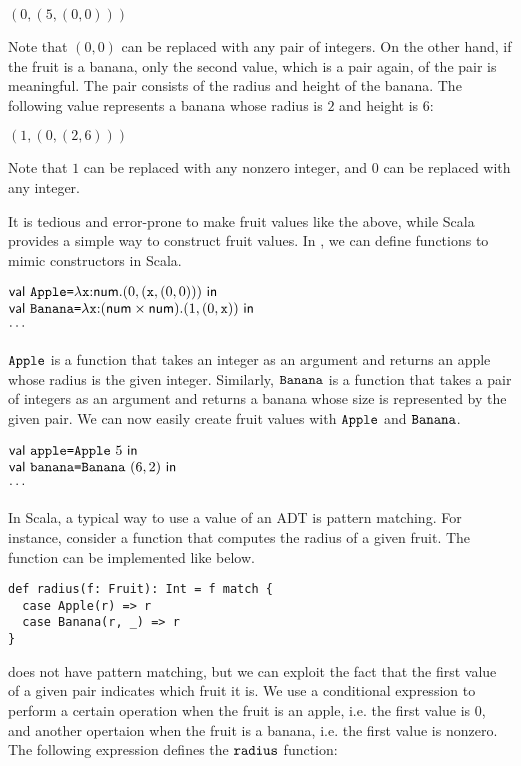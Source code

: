 $(0,(5,(0,0)))$

Note that $(0,0)$ can be replaced with any pair of integers. On the other hand,
if the fruit is a banana, only the second value, which is a pair again, of the
pair is meaningful. The pair consists of the radius and height of the banana.
The following value represents a banana whose radius is $2$ and height is $6$:

$(1,(0,(2,6)))$

Note that $1$ can be replaced with any nonzero integer, and $0$ can be replaced
with any integer.

It is tedious and error-prone to make fruit values like the above, while Scala
provides a simple way to construct fruit values. In \plang, we can define
functions to mimic constructors in Scala.

$
\begin{array}{@{}l}
  \ebind{\code{Apple}}{\efunt{\cx}{\tnum}{(0,(\cx,(0,0)))}}{\\
  \ebind{\code{Banana}}{\efunt{\cx}{(\tnum\times\tnum)}{(1,(0,\cx))}}{\\
  \cdots}}
\end{array}
$

$\texttt{Apple}$ is a function that takes an integer as an argument and returns an
apple whose radius is the given integer. Similarly, $\texttt{Banana}$ is a
function that takes a pair of integers as an argument and returns a banana whose
size is represented by the given pair. We can now easily create fruit values
with $\texttt{Apple}$ and $\texttt{Banana}$.

$
\begin{array}{@{}l}
  \ebind{\code{apple}}{\code{Apple}\ 5}{\\
  \ebind{\code{banana}}{\code{Banana}\ (6,2)}{\\
  \cdots}}
\end{array}
$

In Scala, a typical way to use a value of an ADT is pattern matching. For
instance, consider a function that computes the radius of a given fruit.
The function can be implemented like below.

\begin{verbatim}
def radius(f: Fruit): Int = f match {
  case Apple(r) => r
  case Banana(r, _) => r
}
\end{verbatim}

\plang does not have pattern matching, but we can exploit the fact that the
first value of a given pair indicates which fruit it is. We use a conditional
expression to perform a certain operation when the fruit is an apple, i.e. the
first value is $0$, and another opertaion when the fruit is a banana,
i.e. the first value is nonzero. The following expression defines the
$\texttt{radius}$ function:

